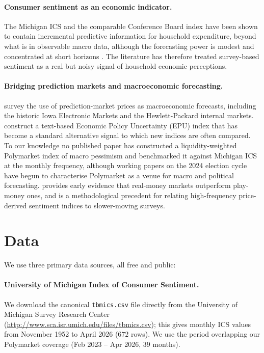 \documentclass{article}
\begin{document}
\paragraph{Consumer sentiment as an economic indicator.}
The Michigan ICS and the comparable Conference Board index have been
shown to contain incremental predictive information for household
expenditure, beyond what is in observable macro data, although the
forecasting power is modest and concentrated at short horizons
\citep{carroll1994does, ludvigson2004consumer, bram1998does}. The
literature has therefore treated survey-based sentiment as a real but
noisy signal of household economic perceptions.

\paragraph{Bridging prediction markets and macroeconomic forecasting.}
\cite{snowberg2013prediction} survey the use of prediction-market prices
as macroeconomic forecasts, including the historic Iowa Electronic
Markets and the Hewlett-Packard internal markets. \cite{baker2016measuring}
construct a text-based Economic Policy Uncertainty (EPU) index that has
become a standard alternative signal to which new indices are often
compared. To our knowledge no published paper has constructed a
liquidity-weighted Polymarket index of macro pessimism and benchmarked it
against Michigan ICS at the monthly frequency, although working papers on
the 2024 election cycle \citep{tsang2026anatomy, cutting2025betting} have
begun to characterise Polymarket as a venue for macro and political
forecasting. \cite{servan2004does} provides early evidence that real-money
markets outperform play-money ones, and \cite{tetlock2007giving} is a
methodological precedent for relating high-frequency price-derived
sentiment indices to slower-moving surveys.

\section{Data}

We use three primary data sources, all free and public:

\paragraph{University of Michigan Index of Consumer Sentiment.}
We download the canonical \texttt{tbmics.csv} file directly from the
University of Michigan Survey Research Center
(\url{http://www.sca.isr.umich.edu/files/tbmics.csv}); this gives
monthly ICS values from November 1952 to April 2026 ($672$ rows). We use
the period overlapping our Polymarket coverage (Feb 2023 -- Apr 2026,
$39$ months).
\end{document}
